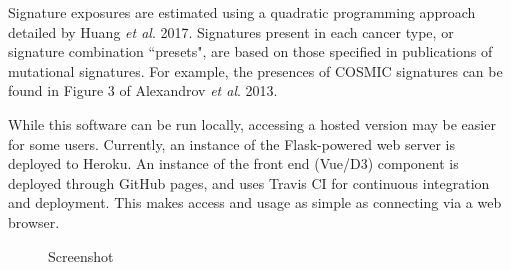 \documentclass[12pt, letterpaper]{article}
\begin{document}
Signature exposures are estimated using a quadratic programming approach detailed by Huang \textit{et al}. 2017\cite{huang2017detecting}.
Signatures present in each cancer type, or signature combination ``presets", are based on those specified in publications of mutational signatures.
For example, the presences of COSMIC signatures can be found in Figure 3 of Alexandrov \textit{et al}. 2013\cite{alexandrov2013signatures}.

While this software can be run locally, accessing a hosted version may be easier for some users.
Currently, an instance of the Flask-powered web server is deployed to Heroku.
An instance of the front end (Vue/D3) component is deployed through GitHub pages, and uses Travis CI for continuous integration and deployment.
This makes access and usage as simple as connecting via a web browser.

\begin{figure}
    \caption{Screenshot}
    \centering
\end{figure}
\end{document}
